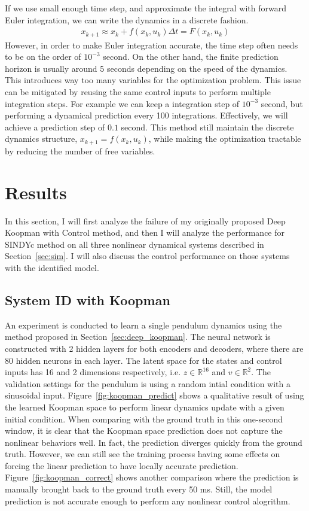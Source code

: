 \documentclass[10pt,twocolumn]{article}
\begin{document}
If we use small enough time step, and approximate the integral with forward Euler integration,
we can write the dynamics in a discrete fashion.
\begin{gather}
  x_{k+1} \approx x_k + f(x_k, u_k) \Delta t = F(x_k, u_k)
\end{gather}
However, in order to make Euler integration accurate, the time step often needs to be
on the order of $10^{-3}$ second. On the other hand, the finite prediction horizon is
usually around 5 seconds depending on the speed of the dynamics.
This introduces way too many variables for the optimization problem. This issue can be
mitigated by reusing the same control inputs to perform multiple integration steps. For example
we can keep a integration step of $10^{-3}$ second, but performing a dynamical prediction
every 100 integrations. Effectively, we will achieve a prediction step of $0.1$ second. This
method still maintain the discrete dynamics structure, $x_{k+1} = f(x_k, u_k)$, while making
the optimization tractable by reducing the number of free variables.

\section{Results}

In this section, I will first analyze the failure of my originally proposed Deep Koopman with
Control method, and then I will analyze the performance for SINDYc method
on all three nonlinear dynamical systems described in Section~\ref{sec:sim}. I will also discuss
the control performance on those systems with the identified model.

\subsection{System ID with Koopman}

An experiment is conducted to learn a single pendulum dynamics using the method proposed
in Section~\ref{sec:deep_koopman}. The neural network is constructed with 2 hidden layers
for both encoders and decoders, where there are 80 hidden neurons in each layer. The
latent space for the states and control inputs has 16 and 2 dimensions respectively, i.e.
$z \in \mathbb{R}^{16}$ and $v \in \mathbb{R}^2$. The validation settings for the pendulum
is using a random intial condition with a sinusoidal input. Figure~\ref{fig:koopman_predict}
shows a qualitative result of using the learned Koopman space to perform linear dynamics update
with a given initial condition. When comparing with the ground truth in this one-second window,
it is clear that the
Koopman space prediction does not capture the nonlinear behaviors well. In fact, the prediction
diverges quickly from the ground truth. However, we can still see the training process
having some effects on forcing the linear prediction to have locally accurate prediction.
Figure~\ref{fig:koopman_correct} shows another comparison where the prediction is manually
brought back to the ground truth every 50 ms. Still, the model prediction is not accurate enough
to perform any nonlinear control alogrithm.
\end{document}
